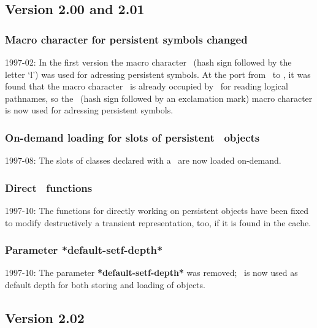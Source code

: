\subsection{Version 2.00 and 2.01}

\subsubsection{Macro character for persistent symbols changed}

1997-02: In the first version the macro character \ (hash
sign followed by the letter `l') was used for adressing persistent
symbols.  At the port from \lw\ to \allegro, it was found that the
macro character \ is already occupied by \allegro\ for
reading logical pathnames, so the \lisp{\#!}\ (hash sign followed by
an exclamation mark) macro character is now used for adressing
persistent symbols.

\subsubsection[On-demand loading for slots of CLOS objects]{On-demand
  loading for slots of persistent \protect\clos\ objects}

1997-08: The slots of classes declared with a
\hspace{\lispblank}\ are
now loaded on-demand.

\subsubsection[Direct `p-...' functions]{Direct \protect{}\
  functions}

1997-10: The functions for directly working on persistent objects have
been fixed to modify destructively a transient representation, too, if
it is found in the cache.

\subsubsection{Parameter *default-setf-depth*}

1997-10: The parameter \textbf{*default-setf-depth*} was removed;
\fcite{*default-depth*}\ is now used as default depth for both storing
and loading of objects.

\subsection{Version 2.02}

